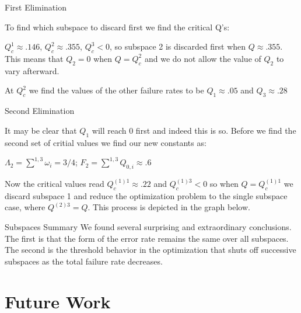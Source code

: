 \documentclass{beamer}
\begin{document}
\begin{frame}{First Elimination}

To find which subspace to discard first we find the critical Q's:

$Q^1_c \approx .146$, $Q^2_c \approx .355$, $Q^3_c <0$, so subspace 2 is discarded first when $Q \approx .355$.  This means that $Q_2 =0$ when $Q = Q^2_c$ and we do not allow the value of $Q_2$ to vary afterward.

At $Q^2_c$ we find the values of the other failure rates to be $Q_1 \approx .05$ and $Q_3 \approx .28$
\end{frame}
\begin{frame}{Second Elimination}

It may be clear that $Q_1$ will reach 0 first and indeed this is so.  Before we find the second set of critial values we find our new constants as:

$\Lambda_2 = \sum^{1,3}\omega_i = 3/4$; $ F_2 = \sum^{1,3} Q_{0,i} \approx .6$

Now the critical values read
$Q^{(1)1}_c \approx .22$ and $Q^{(1)3}_c <0$ so when $ Q = Q^{(1)1}_c$ we discard subspace 1 and reduce the optimization problem to the single subspace case, where $Q^{(2)3} = Q$. This process is depicted in the graph below. 

\end{frame}
\fi

\begin{frame}{Subspaces Summary}
We found several surprising and extraordinary conclusions.  The first is that the form of the error rate remains the same over all subspaces.  The second is the threshold behavior in the optimization that shuts off successive subspaces as the total failure rate decreases.
\end{frame}
\section{Future Work}
\end{document}
